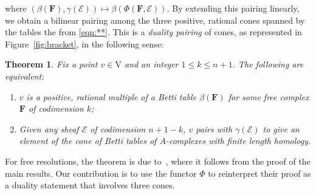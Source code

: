 \documentclass[12pt]{amsart}
\newtheorem{thm}[lemma]{Theorem}
\theoremstyle{definition}
\theoremstyle{remark}
\newcommand{\VV}{\mathrm{V}}
\newcommand{\cE}{\mathcal{E}}
\newcommand{\FF}{\mathbf{F}}
\begin{document}
where $(\beta(\FF),\gamma(\cE))\mapsto \beta(\Phi(\FF,\cE))$.  By extending this pairing linearly, we obtain a bilinear pairing among the three positive, rational cones spanned by the tables the from \eqref{eqn:**}.  This is
 a \emph{duality pairing} of cones, as represented in Figure~\ref{fig:bracket},
in the following sense:
\begin{thm}\label{thm:duality}
Fix a point $v\in \VV$ and an integer $1\leq k\leq n+1$.   The following are equivalent:
\begin{enumerate}
	\item   $v$ is a positive, rational multiple of a Betti table $\beta(\FF)$ for some free complex $\FF$ of codimension $k$;
	\item  Given any sheaf $\cE$ of codimension $n+1-k$, $v$ pairs with $\gamma(\cE)$ to give an element of the cone of Betti tables of $A$-complexes with finite length homology.
\end{enumerate}
\end{thm}
For free resolutions, the theorem is due to~\cite{eis-schrey1}, where it follows from the proof of the main results.  Our contribution is to use the functor $\Phi$ to reinterpret their proof as a duality statement that involves three cones.  %
\end{document}
